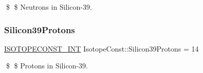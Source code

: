 \$ \$ Neutrons in Silicon-\/39. \mbox{\label{group___isotope_const-_silicon-_si39_gaf9d26fbed9783c156fe3498c7aae719a}} 
\subsubsection{\texorpdfstring{Silicon39\+Protons}{Silicon39Protons}}
{\footnotesize\ttfamily \mbox{\hyperlink{group___isotope_const-_macros_ga5f18360b3e99483a35c32d789e62621c}{I\+S\+O\+T\+O\+P\+E\+C\+O\+N\+S\+T\+\_\+\+I\+NT}} Isotope\+Const\+::\+Silicon39\+Protons = 14}

\$ \$ Protons in Silicon-\/39. 
